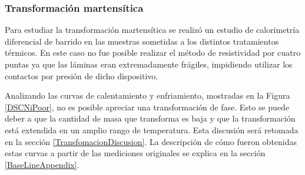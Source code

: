 \documentclass[12pt]{article}
\theoremstyle{definition}
\theoremstyle{remark}
\begin{document}
{\subsubsection{Transformación martensítica}

Para estudiar la transformación martensítica se realizó un estudio de calorimetría diferencial de barrido en las muestras sometidas a los distintos tratamientos térmicos. En este caso no fue posible realizar el método de resistividad por cuatro puntas ya que las láminas eran extremadamente frágiles, impidiendo utilizar los contactos por presión de dicho dispositivo.

Analizando las curvas de calentamiento y enfriamiento, mostradas en la Figura \ref{DSCNiPoor}, no es posible apreciar una transformación de fase. Esto se puede deber a que la cantidad de masa que transforma es baja y que la transformación está extendida en un amplio rango de temperatura. Esta discusión será retomada en la sección \ref{TransfomacionDiscusion}. La descripción de cómo fueron obtenidas estas curvas a partir de las mediciones originales se explica en la sección \ref{BaseLineAppendix}.

}
\end{document}
